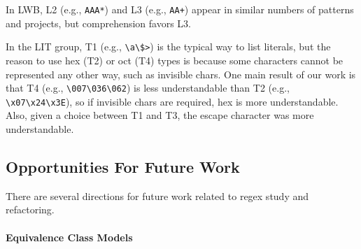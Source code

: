 In  LWB,   L2 (e.g., \verb!AAA*!) and L3 (e.g., \verb!AA+!) appear in similar numbers of patterns and projects, but comprehension favors  L3.


In the LIT group, T1 (e.g., \verb!\a\$>!) is the typical way to list literals, but the reason to use hex (T2) or oct (T4) types is because some characters cannot be represented any other way, such as invisible chars.  One main result of our work is that  T4 (e.g., \verb!\007\036\062!) is  less understandable   than T2 (e.g., \verb!\x07\x24\x3E!), so if invisible chars are required, hex is  more understandable.
Also, given a choice between T1 and T3, the escape character was more understandable.

\subsection{Opportunities For Future Work}
\label{sec:futureequivclasses}
There are several directions for future work related to regex study and refactoring.
%
\paragraph{Equivalence Class Models}

